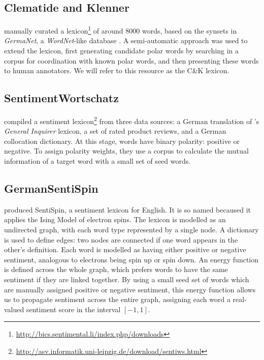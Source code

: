 \documentclass[11pt]{article}
\begin{document}
\subsection{Clematide and Klenner}

 manually curated a lexicon\footnote{\url{http://bics.sentimental.li/index.php/downloads}} of around 8000
words, based on the synsets in \emph{GermaNet}, a \emph{WordNet}-like database \cite{hamp1997germanet}. A semi-automatic approach was used to extend the lexicon, first
generating candidate polar words by searching in a corpus for coordination
with known polar words, and then presenting these words to human annotators.  We will refer to this resource as the C\&K lexicon.


\subsection{SentimentWortschatz} \label{sub:WortSchatz}

 compiled a sentiment lexicon\footnote{\url{http://asv.informatik.uni-leipzig.de/download/sentiws.html}} from three data
sources: a German translation of 's \emph{General
Inquirer} lexicon, a set of rated product reviews, and a German collocation
dictionary. At this stage, words have binary polarity: positive or
negative. To assign polarity weights, they use a corpus to calculate
the mutual information of a target word with a small set of seed words.


\subsection{GermanSentiSpin} \label{sub:SentiSpin}

 produced SentiSpin, a sentiment lexicon
for English. It is so named becaused it applies the Ising Model of
electron spins. The lexicon is modelled as an undirected graph, with
each word type represented by a single node. A dictionary is used
to define edges: two nodes are connected if one word appears in the
other's definition. Each word is modelled as having either positive
or negative sentiment, analogous to electrons being spin up or spin
down. An energy function is defined across the whole graph, which
prefers words to have the same sentiment if they are linked together.
By using a small seed set of words which are manually assigned positive
or negative sentiment, this energy function allows us to propagate
sentiment across the entire graph, assigning each word a real-valued
sentiment score in the interval $\left[-1,1\right]$.
\end{document}
